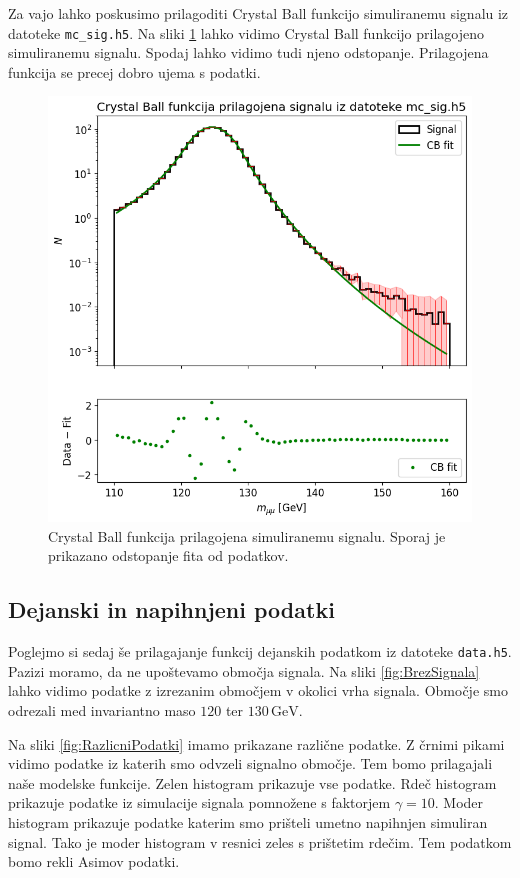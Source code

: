 \documentclass[slovene,11pt,a4paper]{article}
\begin{document}
Za vajo lahko poskusimo prilagoditi Crystal Ball funkcijo simuliranemu signalu iz datoteke \texttt{mc\_sig.h5}. Na sliki \ref{fig:CB} lahko vidimo Crystal Ball funkcijo prilagojeno simuliranemu signalu. Spodaj lahko vidimo tudi njeno odstopanje. Prilagojena funkcija se precej dobro ujema s podatki.

\begin{figure}[h!]
    \centering
    \includegraphics[width=0.8\linewidth]{imgs/CB.png}
    \caption{Crystal Ball funkcija prilagojena simuliranemu signalu. Sporaj je prikazano odstopanje fita od podatkov.}
    \label{fig:CB}
\end{figure}

\subsection{Dejanski in napihnjeni podatki}

Poglejmo si sedaj še prilagajanje funkcij dejanskih podatkom iz datoteke \texttt{data.h5}. Pazizi moramo, da ne upoštevamo območja signala. Na sliki \ref{fig:BrezSignala} lahko vidimo podatke z izrezanim območjem v okolici vrha signala. Območje smo odrezali med invariantno maso $120$ ter $130 \, \text{GeV}$.

Na sliki \ref{fig:RazlicniPodatki} imamo prikazane različne podatke. Z črnimi pikami vidimo podatke iz katerih smo odvzeli signalno območje. Tem bomo prilagajali naše modelske funkcije. Zelen histogram prikazuje vse podatke. Rdeč histogram prikazuje podatke iz simulacije signala pomnožene s faktorjem $\gamma = 10$. Moder histogram prikazuje podatke katerim smo prišteli umetno napihnjen simuliran signal. Tako je moder histogram v resnici zeles s prištetim rdečim. Tem podatkom bomo rekli Asimov podatki.
\end{document}
